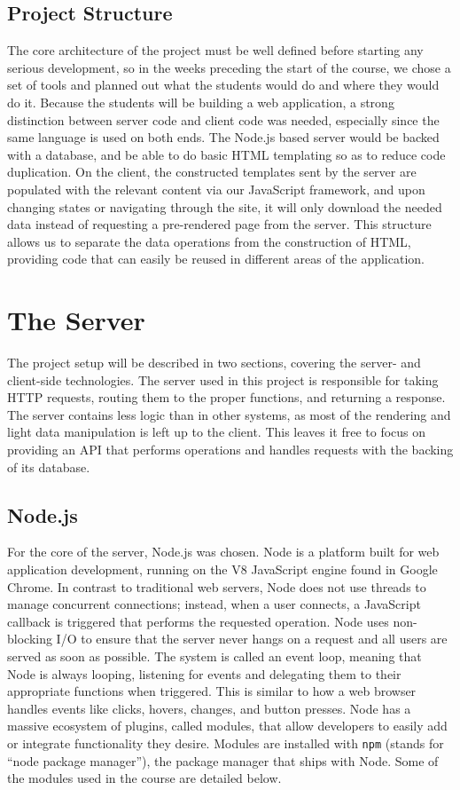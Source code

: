 \documentclass[12pt]{article}
\newcommand{\code}[1]{{\texttt {#1}}}
\begin{document}
\subsection{Project Structure}\label{sec:structure}
The core architecture of the project must be well defined before starting any serious development, so in the weeks preceding the start of the course, we chose a set of tools and planned out what the students would do and where they would do it. Because the students will be building a web application, a strong distinction between server code and client code was needed, especially since the same language is used on both ends. The Node.js based server would be backed with a database, and be able to do basic HTML templating so as to reduce code duplication. On the client, the constructed templates sent by the server are populated with the relevant content via our JavaScript framework, and upon changing states or navigating through the site, it will only download the needed data instead of requesting a pre-rendered page from the server. This structure allows us to separate the data operations from the construction of HTML, providing code that can easily be reused in different areas of the application.

\section{The Server}\label{sec:server}
The project setup will be described in two sections, covering the server- and client-side technologies. The server used in this project is responsible for taking HTTP requests, routing them to the proper functions, and returning a response. The server contains less logic than in other systems, as most of the rendering and light data manipulation is left up to the client. This leaves it free to focus on providing an API that performs operations and handles requests with the backing of its database.

\subsection{Node.js}\label{sec:node}
For the core of the server, Node.js\cite{Node} was chosen. Node is a platform built for web application development, running on the V8 JavaScript engine found in Google Chrome. In contrast to traditional web servers, Node does not use threads to manage concurrent connections; instead, when a user connects, a JavaScript callback is triggered that performs the requested operation. Node uses non-blocking I/O to ensure that the server never hangs on a request and all users are served as soon as possible. The system is called an event loop, meaning that Node is always looping, listening for events and delegating them to their appropriate functions when triggered. This is similar to how a web browser handles events like clicks, hovers, changes, and button presses. Node has a massive ecosystem of plugins, called modules, that allow developers to easily add or integrate functionality they desire. Modules are installed with \code{npm} (stands for ``node package manager''), the package manager that ships with Node. Some of the modules used in the course are detailed below.
\end{document}
